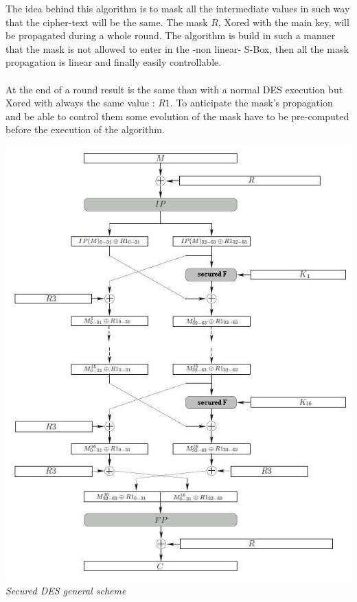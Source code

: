 The idea behind this algorithm is to mask all the intermediate values in 
such way that the cipher-text will be the same. 
The mask $R$, Xored with the main key, will be propagated during a whole round.
The algorithm is build in such a manner that the mask is not allowed to enter in the 
-non linear- S-Box, then all the mask propagation is linear and finally easily controllable.

\paragraph*{}
At the end of a round result is the same than with a normal DES execution
but Xored with always the same value : $R1$. 
To anticipate the mask's propagation and be able to control them
some evolution of the mask have to be pre-computed before the 
execution of the algorithm.


\begin{center}
\includegraphics[scale=1.15]{images/dessecured.jpg}\\
\textit{Secured DES general scheme}
\end{center}
\newpage

